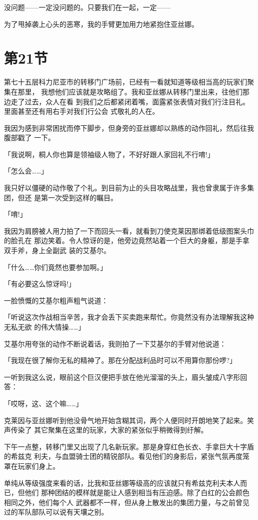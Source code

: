 \documentclass[11pt]{book}
\begin{document}
没问题——一定没问题的。只要我们在一起，一定——

为了甩掉袭上心头的恶寒，我的手臂更加用力地紧抱住亚丝娜。
\section{第21节}
\label{sec:org9f5f3c7}
第七十五层科力尼亚市的转移门广场前，已经有一看就知道等级相当高的玩家们聚集在那里，
我想他们应该就是攻略组了。我和亚丝娜从转移门里出来，往他们那边走了过去，众人在看
到我们之后都紧闭着嘴，面露紧张表情对我们行注目礼。里面甚至还有用右手对我们行公会
式敬礼的人在。

我因为感到非常困扰而停下脚步，但身旁的亚丝娜却以熟练的动作回礼，然后往我腹部戳了
一下。

「我说啊，桐人你也算是领袖级人物了，不好好跟人家回礼不行唷!」

「怎么会……」

我只好以僵硬的动作敬了个礼。到目前为止的头目攻略战里，我也曾隶属于许多集团，但还
是第一次受到这样的瞩目。

「唷!」

我因为肩膀被人用力拍了一下而回头一看，就看到刀使克莱因那绑着低级图案头巾的脸孔在
那边笑着。令人惊讶的是，他旁边竟然站着一个巨大的身躯，那是手拿双手斧，身上全副武
装的艾基尔。

「什么……你们竟然也要参加啊。」

「有必要这么惊讶吗!」

一脸愤慨的艾基尔粗声粗气说道：

「听说这次作战相当辛苦，我才会丢下买卖跑来帮忙。你竟然没有办法理解我这种无私无欲
的伟大情操……」

艾基尔用夸张的动作不断说着话，我则拍了一下艾基尔的手臂对他说道：

「我现在很了解你无私的精神了。那在分配战利品时可以不用算你那份啰?」

一听到我这么说，眼前这个巨汉便把手放在他光溜溜的头上，眉头皱成八字形回答：

「哎呀，这、这个嘛……」

克莱因与亚丝娜听到他没骨气地开始含糊其词，两个人便同时开朗地笑了起来。笑声传染了
其它聚集在这里的玩家，大家的紧张似乎稍微得到纡解。

下午一点整，转移门里又出现了几名新玩家。那是身穿红色长衣、手拿巨大十字盾的希兹克
利夫，与血盟骑士团的精锐部队。看见他们的身影后，紧张气氛再度笼罩在玩家们身上。

单纯从等级强度来看的话，比我和亚丝娜等级高的应该就只有希兹克利夫本人而已，但他们
那种团结的模样就是能让人感到相当有压迫感。除了白红的公会颜色相同之外，他们每个人
武器都不一样，但从身上散发出的集团力量，与之前曾见过的军队部队可以说有天壤之别。
\end{document}
